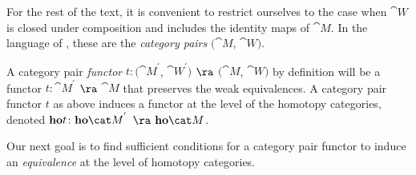 For the rest of the text, it is convenient to restrict ourselves to the case when ${\cat W}$ is closed under composition and includes the identity maps of ${\cat M}$. In the language of , these are the {\it category pairs} $({\cat M}$, ${\cat W})$. 

A category pair {\it functor} $t \colon ({\cat M}^{'}$, ${\cat W}^{'})$ $\ra$ $({\cat M}$, ${\cat W})$ by definition will be a functor $t \colon {\cat M}^{'}$ $\ra$ ${\cat M}$ that preserves the weak equivalences. A category pair functor $t$ as above induces a functor at the level of the homotopy categories, denoted ${\bf ho}t \colon {\bf ho}{\cat M}^{'}$ $\ra$ ${\bf ho}{\cat M}$.

Our next goal is to find sufficient conditions for a category pair functor to induce an {\it equivalence} at the level of homotopy categories.

